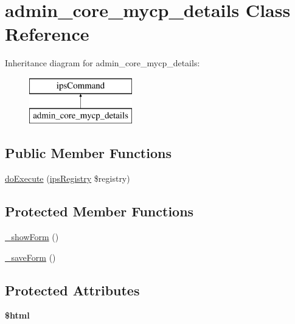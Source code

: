 \hypertarget{classadmin__core__mycp__details}{\section{admin\-\_\-core\-\_\-mycp\-\_\-details Class Reference}
\label{classadmin__core__mycp__details}
}
Inheritance diagram for admin\-\_\-core\-\_\-mycp\-\_\-details\-:\begin{figure}[H]
\begin{center}
\leavevmode
\includegraphics[height=2.000000cm]{classadmin__core__mycp__details}
\end{center}
\end{figure}
\subsection*{Public Member Functions}
\begin{DoxyCompactItemize}
\item 
\hyperlink{classadmin__core__mycp__details_afbc4e912a0604b94d47d66744c64d8ba}{do\-Execute} (\hyperlink{classips_registry}{ips\-Registry} \$registry)
\end{DoxyCompactItemize}
\subsection*{Protected Member Functions}
\begin{DoxyCompactItemize}
\item 
\hyperlink{classadmin__core__mycp__details_a5741a03d8eba52b11a74e90df95f1ab8}{\-\_\-show\-Form} ()
\item 
\hyperlink{classadmin__core__mycp__details_ace778d8268227835e3735b224c11a89c}{\-\_\-save\-Form} ()
\end{DoxyCompactItemize}
\subsection*{Protected Attributes}
\begin{DoxyCompactItemize}
\item 
\hypertarget{classadmin__core__mycp__details_a6f96e7fc92441776c9d1cd3386663b40}{{\bfseries \$html}}\label{classadmin__core__mycp__details_a6f96e7fc92441776c9d1cd3386663b40}

\end{DoxyCompactItemize}
